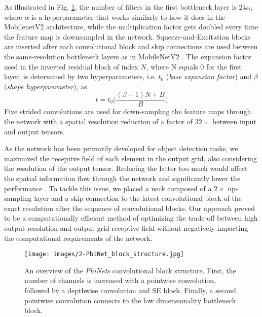 As illustrated in Fig. \ref{fig:convblock_structure}, the number of filters in the first bottleneck layer is $24 \alpha$, where $\alpha$ is a hyperparameter that works similarly to how it does in the MobilenetV2 architecture, while the multiplication factor gets doubled every time the feature map is downsampled in the network. Squeeze-and-Excitation blocks \cite{hu2018squeeze} are inserted after each convolutional block and skip connections are used between the same-resolution bottleneck layers as in MobileNetV2 \cite{sandler2018mobilenetv2}.
The expansion factor used in the inverted residual block of index $N$, where N equals 0 for the first layer, is determined by two hyperparameters, i.e. $t_0$ (\textit{base expansion factor}) and $\beta$ (\textit{shape hyperparameter}), as 
\begin{equation}
    t=t_0 \bigg( \frac{(\beta-1)N+B}{B} \bigg)
\end{equation}
Five strided convolutions are used for down-sampling the feature maps through the network with a spatial resolution reduction of a factor of $32\times$ between input and output tensors.

As the network has been primarily developed for object detection tasks, we maximized the receptive field of each element in the output grid, also considering the resolution of the output tensor. Reducing the latter too much would affect the spatial information flow through the network and significantly lower the performance \cite{bochkovskiy2020yolov4}. To tackle this issue, we placed a neck composed of a $2\times$ up-sampling layer and a skip connection to the latest convolutional block of the exact resolution after the sequence of convolutional blocks.
Our approach proved to be a computationally efficient method of optimizing the trade-off between high output resolution and output grid receptive field without negatively impacting the computational requirements of the network.

\begin{figure}[h]
  \centering
  \texttt{[image: images/2-PhiNet\_block\_structure.jpg]}
  \caption{An overview of the \textit{PhiNets} convolutional block structure. First, the number of channels is increased with a pointwise convolution, followed by a depthwise convolution and SE block. Finally, a second pointwise convolution connects to the low dimensionality bottleneck block.}
  \label{fig:convblock_structure}
\end{figure}

